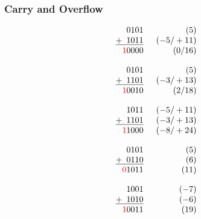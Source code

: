 \documentclass[aspectratio=169]{beamer}
\newif\iftransitions
\begin{document}
\begin{frame}
  \frametitle{Carry and Overflow}
  
  \begin{multicols}{3}
  \begin{equation*}\begin{array}{c}
   \phantom{+9}0101 \phantom{999-+/99} (5) \\
   \underline{+\phantom{9}1011} \phantom{999} (-5/+11) \\
   \phantom{+}\textcolor{red}{1}0000 \phantom{999-+} (0/16)
  \end{array}\end{equation*} \iftransitions \pause \fi 
  
  \begin{equation*}\begin{array}{c}
   \phantom{+9}0101 \phantom{999-+/99} (5) \\
   \underline{+\phantom{9}1101} \phantom{999} (-3/+13) \\
   \phantom{+}\textcolor{red}{1}0010 \phantom{999-+} (2/18)
  \end{array}\end{equation*} \iftransitions \pause \fi 
  
  \begin{equation*}\begin{array}{c}
   \phantom{+9}1011 \phantom{999} (-5/+11) \\
   \underline{+\phantom{9}1101} \phantom{999} (-3/+13) \\
   \phantom{+}\textcolor{red}{1}1000 \phantom{999} (-8/+24)
  \end{array}\end{equation*} \iftransitions \pause \fi 
  \end{multicols}
  
  \begin{multicols}{2}
  \begin{equation*}\begin{array}{c}
   \phantom{+9}0101 \phantom{999-+/99} (5) \\
   \underline{+\phantom{9}0110} \phantom{999-+/99} (6) \\
   \phantom{+}\textcolor{red}{0}1011 \phantom{999-+/9} (11)
  \end{array}\end{equation*} \iftransitions \pause \fi 
  
  \begin{equation*}\begin{array}{c}
   \phantom{+9}1001 \phantom{999+/99} (-7) \\
   \underline{+\phantom{9}1010} \phantom{999+/99} (-6) \\
   \phantom{+}\textcolor{red}{1}0011 \phantom{999-+/9} (19)
  \end{array}\end{equation*}
  \end{multicols}
  

\end{frame}
\end{document}
